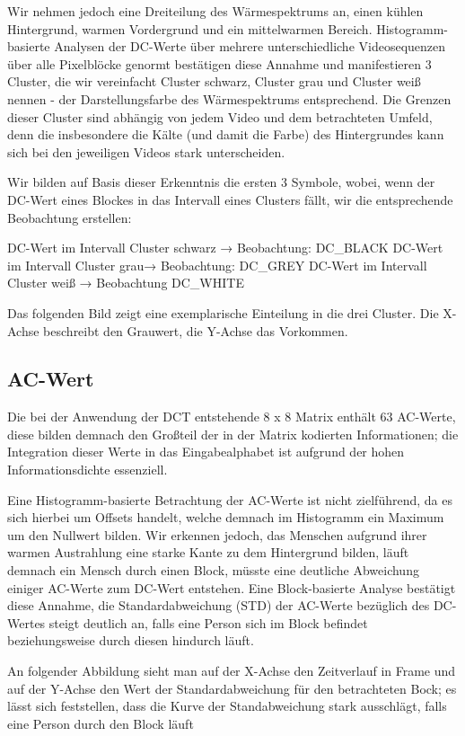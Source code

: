 Wir nehmen jedoch eine Dreiteilung des Wärmespektrums an, einen kühlen Hintergrund, warmen Vordergrund und ein mittelwarmen Bereich. Histogramm-basierte Analysen der DC-Werte über mehrere unterschiedliche Videosequenzen über alle Pixelblöcke genormt bestätigen diese Annahme und manifestieren 3 Cluster, die wir vereinfacht Cluster schwarz, Cluster grau und Cluster weiß nennen - der Darstellungsfarbe des Wärmespektrums entsprechend. Die Grenzen dieser Cluster sind abhängig von jedem Video und dem betrachteten Umfeld, denn die insbesondere die Kälte (und damit die Farbe) des Hintergrundes kann sich bei den jeweiligen Videos stark unterscheiden.

Wir bilden auf Basis dieser Erkenntnis die ersten 3 Symbole, wobei, wenn der DC-Wert eines Blockes in das Intervall eines Clusters fällt, wir die entsprechende Beobachtung erstellen:

DC-Wert im Intervall Cluster schwarz → Beobachtung: DC\_BLACK
DC-Wert im Intervall Cluster grau→ Beobachtung: DC\_GREY
DC-Wert im Intervall Cluster weiß → Beobachtung DC\_WHITE

Das folgenden Bild zeigt eine exemplarische Einteilung in die drei Cluster. Die X-Achse beschreibt den Grauwert, die Y-Achse das Vorkommen.



\subsection{AC-Wert}

Die bei der Anwendung der DCT entstehende 8 x 8 Matrix enthält 63 AC-Werte, diese bilden demnach den Großteil der in der Matrix kodierten Informationen; die Integration dieser Werte in das Eingabealphabet ist aufgrund der hohen Informationsdichte essenziell. 

Eine Histogramm-basierte Betrachtung der AC-Werte ist nicht zielführend, da es sich hierbei um Offsets handelt, welche demnach im Histogramm ein Maximum um den Nullwert bilden. Wir erkennen jedoch, das Menschen aufgrund ihrer warmen Austrahlung eine starke Kante zu dem Hintergrund bilden, läuft demnach ein Mensch durch einen Block, müsste eine deutliche Abweichung einiger AC-Werte zum DC-Wert entstehen. Eine Block-basierte Analyse bestätigt diese Annahme, die Standardabweichung (STD) der AC-Werte bezüglich des DC-Wertes steigt deutlich an, falls eine Person sich im Block befindet beziehungsweise durch diesen hindurch läuft. 

An folgender Abbildung sieht man auf der X-Achse den Zeitverlauf in Frame und auf der Y-Achse den Wert der Standardabweichung für den betrachteten Bock; es lässt sich feststellen, dass die Kurve der Standabweichung stark ausschlägt, falls eine Person durch den Block läuft


